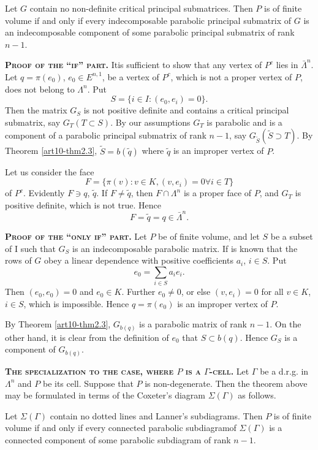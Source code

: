 \begin{enumerate}
\setcounter{theorem}{5}
\begin{theorem}\label{art10-thm2.6}
Let $G$ contain no non-definite critical principal submatrices. Then $P$ is of finite volume if and only if every indecomposable parabolic principal submatrix of $G$ is an indecomposable component of some parabolic principal submatrix of rank $n-1$.
\end{theorem}

\medskip
\textbf{\textsc{Proof of the ``if'' part.}} It\pageoriginale is sufficient to show that any vertex of $P^c$ lies in $\bar{\Lambda}^n$. Let $q = \pi (e_0)$, $e_0 \in E^{n,1}$, be a vertex of $P^c$, which is not a proper vertex of $P$, \ie does not belong to $\Lambda^n$. Put
$$
S = \{i \in I: (e_0, e_i) = 0\}.
$$
Then the matrix $G_S$ is not positive definite and contains a critical principal submatrix, say $G_T (T \subset S)$. By our assumptions $G_T$ is parabolic and is a component of a parabolic principal submatrix of rank $n-1$, say $G_{\tilde{S}} (\tilde{S} \supset T)$. By Theorem \ref{art10-thm2.3}, $\tilde{S} = b (\tilde{q})$ where $\tilde{q}$ is an improper vertex of $P$.

Let us consider the face
$$
F = \{\pi(v) : v \in K, (v, e_i) = 0 \forall i \in T\}
$$
of $P^c$. Evidently $F \ni q$, $\tilde{q}$. If $F \neq \tilde{q}$, then $F \cap \Lambda^n$ is a proper face of $P$, and $G_T$ is positive definite, which is not true. Hence
$$
F = \tilde{q} = q \in  \bar{\Lambda}^n.
$$

\medskip
\textbf{\textsc{Proof of the ``only if'' part.}} Let $P$ be of finite volume, and let $S$ be a subset of I such that $G_S$ is an indecomposable parabolic matrix. If is known \cite{art10-key1} that the rows of $G$ obey a linear dependence with positive coefficients $a_i$, $i \in S$. Put
$$
e_0 = \sum\limits_{i \in S} a_i e_i.
$$
Then $(e_0, e_0) =0$ and $e_0 \in K$. Further $e_0 \neq 0$, or else $(v, e_i) =0$ for all $v \in K$, $i\in S$, which is impossible. Hence $q = \pi (e_0)$ is an improper vertex of $P$.

By Theorem \ref{art10-thm2.3}, $G_{b(q)}$ is a parabolic matrix of rank $n-1$. On the other hand, it is clear from the definition of $e_0$ that $S \subset b(q)$. Hence $G_S$ is a component of $G_{b(q)}$.

\medskip
\textbf{\textsc{The specialization to the case, where $P$ is a $\Gamma$-cell.}} Let $\Gamma$ be a d.r.g. in $\Lambda^n$ and $P$ be its cell. Suppose that $P$ is non-degenerate. Then the theorem above may be formulated in terms of the Coxeter's diagram $\Sigma (\Gamma)$ as follows.

\setcounter{theorem}{5}
\begin{theorembis}\label{art10-thmbis2.6}
Let $\Sigma (\Gamma)$ contain no dotted lines and Lanner's subdiagrams. Then $P$ is of finite volume if and only if every connected parabolic subdiagram\pageoriginale of $\Sigma (\Gamma)$ is a connected component of some parabolic subdiagram of rank $n -1$.
\end{theorembis}
\end{enumerate}

